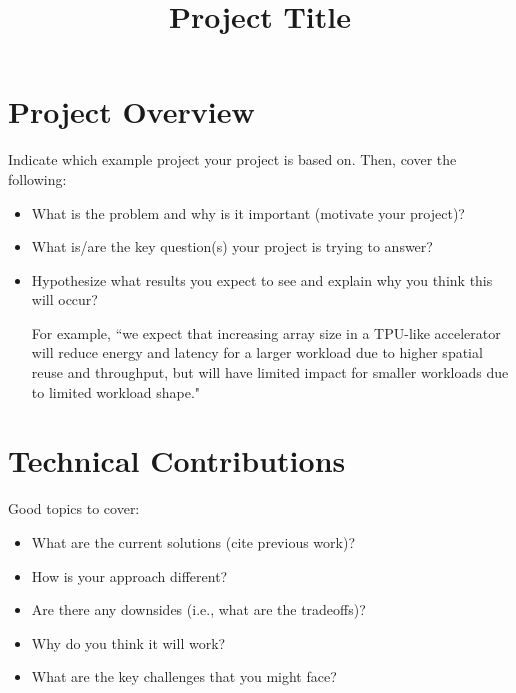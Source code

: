 \documentclass[conference,onecolumn]{IEEEtran}
\begin{document}
\title{Project Title}

\author{
\and
{}
}

\maketitle


\section{Project Overview}
Indicate which example project your project is based on. Then, cover the following:
\begin{itemize}
    \item What is the problem and why is it important (motivate your project)?

    \item What is/are the key question(s) your project is trying to answer?

    \item Hypothesize what results you expect to see and explain why you think this will occur?
    
    For example, ``we expect that increasing array size in a TPU-like accelerator will reduce energy and latency for a larger workload due to higher spatial reuse and throughput, but will have limited impact for smaller workloads due to limited workload shape."
\end{itemize}


\section{Technical Contributions}
Good topics to cover:
\begin{itemize}
    \item What are the current solutions (cite previous work)?
    \item How is your approach different?
    \item Are there any downsides (i.e., what are the tradeoffs)?
    \item Why do you think it will work?
    \item What are the key challenges that you might face?
\end{itemize}
\end{document}
